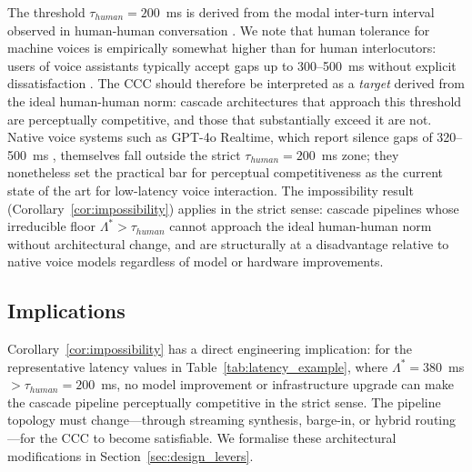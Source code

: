 The threshold $\tau_{human} = 200$~ms is derived from the modal inter-turn interval observed in human-human conversation \citep{levinson2015timing,stivers2009universals}.
We note that human tolerance for machine voices is empirically somewhat higher than for human interlocutors: users of voice assistants typically accept gaps up to 300--500~ms without explicit dissatisfaction \citep{levinson2015timing}.
The CCC should therefore be interpreted as a \emph{target} derived from the ideal human-human norm: cascade architectures that approach this threshold are perceptually competitive, and those that substantially exceed it are not.
Native voice systems such as GPT-4o Realtime, which report silence gaps of 320--500~ms \citep{openai2024realtimeapi}, themselves fall outside the strict $\tau_{human} = 200$~ms zone; they nonetheless set the practical bar for perceptual competitiveness as the current state of the art for low-latency voice interaction.
The impossibility result (Corollary~\ref{cor:impossibility}) applies in the strict sense: cascade pipelines whose irreducible floor $\Lambda^* > \tau_{human}$ cannot approach the ideal human-human norm without architectural change, and are structurally at a disadvantage relative to native voice models regardless of model or hardware improvements.

\subsection{Implications}

Corollary~\ref{cor:impossibility} has a direct engineering implication:
for the representative latency values in Table~\ref{tab:latency_example},
where $\Lambda^* = 380$~ms $> \tau_{human} = 200$~ms,
no model improvement or infrastructure upgrade can make the cascade pipeline
perceptually competitive in the strict sense.
The pipeline topology must change---through streaming synthesis, barge-in, or hybrid
routing---for the CCC to become satisfiable.
We formalise these architectural modifications in Section~\ref{sec:design_levers}.

